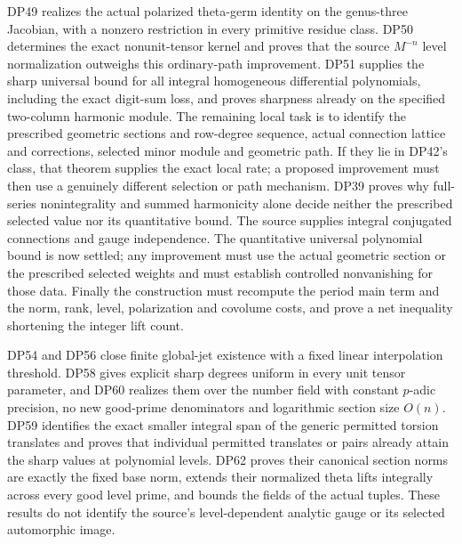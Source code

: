 \documentclass[11pt,a4paper]{article}
\theoremstyle{definition}\newtheorem{remark}[theorem]{Remark}
\begin{document}
DP49 realizes the actual polarized theta-germ identity on the genus-three Jacobian, with a nonzero restriction in every primitive residue class. DP50 determines the exact nonunit-tensor kernel and proves that the source $M^{-n}$ level normalization outweighs this ordinary-path improvement. DP51 supplies the sharp universal bound for all integral homogeneous differential polynomials, including the exact digit-sum loss, and proves sharpness already on the specified two-column harmonic module. The remaining local task is to identify the prescribed geometric sections and row-degree sequence, actual connection lattice and corrections, selected minor module and geometric path. If they lie in DP42's class, that theorem supplies the exact local rate; a proposed improvement must then use a genuinely different selection or path mechanism. DP39 proves why full-series nonintegrality and summed harmonicity alone decide neither the prescribed selected value nor its quantitative bound. The source supplies integral conjugated connections and gauge independence. The quantitative universal polynomial bound is now settled; any improvement must use the actual geometric section or the prescribed selected weights and must establish controlled nonvanishing for those data. Finally the construction must recompute the period main term and the norm, rank, level, polarization and covolume costs, and prove a net inequality shortening the integer lift count.

DP54 and DP56 close finite global-jet existence with a fixed linear interpolation threshold. DP58 gives explicit sharp degrees uniform in every unit tensor parameter, and DP60 realizes them over the number field with constant $p$-adic precision, no new good-prime denominators and logarithmic section size $O(n)$. DP59 identifies the exact smaller integral span of the generic permitted torsion translates and proves that individual permitted translates or pairs already attain the sharp values at polynomial levels. DP62 proves their canonical section norms are exactly the fixed base norm, extends their normalized theta lifts integrally across every good level prime, and bounds the fields of the actual tuples. These results do not identify the source's level-dependent analytic gauge or its selected automorphic image.
\end{document}
